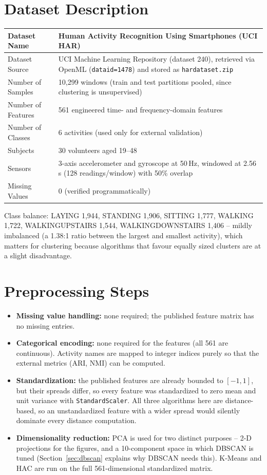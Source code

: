 \documentclass[12pt,a4paper]{article}
\DeclareRobustCommand{\_}{\textunderscore\allowbreak}
\begin{document}
\section{Dataset Description}
\begin{longtable}{|p{6cm}|p{8cm}|}
\hline
Dataset Name & Human Activity Recognition Using Smartphones (UCI HAR) \\ \hline
Dataset Source & UCI Machine Learning Repository (dataset 240), retrieved via
OpenML (\texttt{data\_id=1478}) and stored as \texttt{har\_dataset.zip} \\ \hline
Number of Samples & 10{,}299 windows (train and test partitions pooled, since
clustering is unsupervised) \\ \hline
Number of Features & 561 engineered time- and frequency-domain features \\ \hline
Number of Classes & 6 activities (used only for external validation) \\ \hline
Subjects & 30 volunteers aged 19--48 \\ \hline
Sensors & 3-axis accelerometer and gyroscope at 50\,Hz, windowed at 2.56\,s
(128 readings/window) with 50\% overlap \\ \hline
Missing Values & 0 (verified programmatically) \\ \hline
\end{longtable}

\noindent Class balance: LAYING 1{,}944, STANDING 1{,}906, SITTING 1{,}777,
WALKING 1{,}722, WALKING\_UPSTAIRS 1{,}544, WALKING\_DOWNSTAIRS 1{,}406 --
mildly imbalanced (a 1.38:1 ratio between the largest and smallest activity),
which matters for clustering because algorithms that favour equally sized
clusters are at a slight disadvantage.

\section{Preprocessing Steps}
\begin{itemize}[nosep]
\item \textbf{Missing value handling:} none required; the published feature
matrix has no missing entries.
\item \textbf{Categorical encoding:} none required for the features (all 561
are continuous). Activity names are mapped to integer indices purely so that
the external metrics (ARI, NMI) can be computed.
\item \textbf{Standardization:} the published features are already bounded to
$[-1, 1]$, but their spreads differ, so every feature was standardized to zero
mean and unit variance with \texttt{StandardScaler}. All three algorithms here
are distance-based, so an unstandardized feature with a wider spread would
silently dominate every distance computation.
\item \textbf{Dimensionality reduction:} PCA is used for two distinct
purposes -- 2-D projections for the figures, and a 10-component space in
which DBSCAN is tuned (Section~\ref{sec:dbscan} explains why DBSCAN needs
this). K-Means
and HAC are run on the full 561-dimensional standardized matrix.
\end{itemize}
\end{document}
